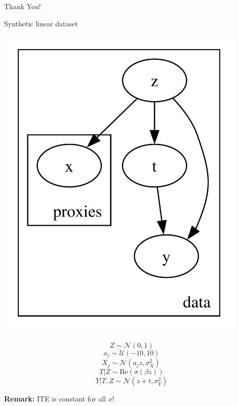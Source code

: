 \documentclass[10pt]{beamer}
\begin{document}
{
\begin{frame}[standout]
\thispagestyle{empty}
  {\LARGE Thank You!}
\end{frame}
}





\begin{frame}{Synthetic linear dataset}
    \begin{minipage}{0.48\textwidth}
      \includegraphics[width=0.9\textwidth]{images/pyro_model.pdf}
    \end{minipage}
    \begin{minipage}{0.48\textwidth}
        \begin{equation*}
        Z \sim \mathcal{N}(0,1)
        \end{equation*}
        \begin{equation*}
             a_j \sim \mathcal{U}(-10,10)
        \end{equation*}
        \begin{equation*}
        X_j \sim \mathcal{N}(a_j z,\sigma_X^2)\,    
        \end{equation*}
        \begin{equation*}
        T | Z \sim \mathrm{Be}(\sigma(\beta z))    
        \end{equation*}
        \small{\begin{equation*}
        Y|T,Z \sim \mathcal{N}(z + t, \sigma_Y^2)            
        \end{equation*}}
      \end{minipage}
      \centering
      {\textbf{Remark:} ITE is constant for all  $x$!}
\end{frame}
\end{document}
